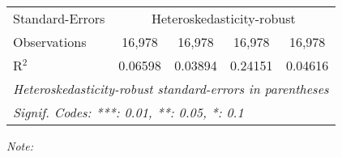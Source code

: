 \begin{table}[htbp!]
\begin{adjustbox}{width = 1\textwidth, max height = 0.95\textheight, center}
\begin{threeparttable}[b]
\begin{tabular}{lcccc}
            \midrule 
            Standard-Errors & \multicolumn{4}{c}{Heteroskedasticity-robust} \\ 
            Observations         & 16,978                         & 16,978                          & 16,978                        & 16,978\\  
            R$^2$                & 0.06598                        & 0.03894                         & 0.24151                       & 0.04616\\  
            \midrule \midrule
            \multicolumn{5}{l}{\emph{Heteroskedasticity-robust standard-errors in parentheses}}\\
            \multicolumn{5}{l}{\emph{Signif. Codes: ***: 0.01, **: 0.05, *: 0.1}}\\
         \end{tabular}
         
         \begin{tablenotes}\item \medskip \textit{Note:}
         \end{tablenotes}
      \end{threeparttable}
   \end{adjustbox}
\end{table}


